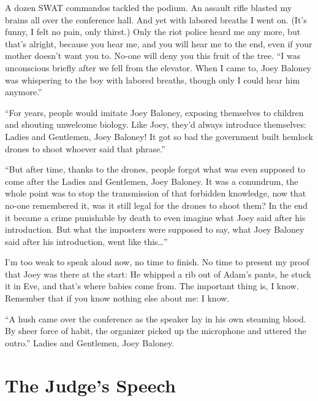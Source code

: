 \documentclass[oneside]{book}
\begin{document}
A dozen SWAT commandos tackled the podium.
An assault rifle blasted my brains all over the conference hall.
And yet with labored breaths I went on.
(It's funny, I felt no pain, only thirst.)
Only the riot police heard me any more, but that's alright,
because you hear me, and you will hear me to the end, even if your mother
doesn't want you to.  No-one will deny you this fruit of the tree.
``I was unconscious briefly after we fell from the elevator.
When I came to, Joey Baloney was whispering to the boy with labored breaths,
though only I could hear him anymore.''

``For years, people would imitate Joey Baloney, exposing themselves to children
and shouting unwelcome biology.  Like Joey, they'd always introduce themselves:
Ladies and Gentlemen, Joey Baloney!  It got so bad the government built
hemlock drones to shoot whoever said that phrase.''

``But after time, thanks to the drones, people forgot what was even supposed to come
after the Ladies and Gentlemen, Joey Baloney.  It was a conundrum, the
whole point was to stop the transmission of that forbidden knowledge,
now that no-one remembered it, was it still legal for the drones to shoot them?
In the end it became a crime punishable by death to even imagine what Joey
said after his introduction.
But what the imposters were supposed to say, what Joey Baloney said after his
introduction, went like this\ldots''

I'm too weak to speak aloud now, no time to finish.
No time to present my proof that Joey was there at the start:
He whipped a rib out of Adam's pants, he stuck it in Eve, and that's where
babies come from.  The important thing is, I know.
Remember that if you know nothing else about me: I know.

``A hush came over the conference as the speaker lay in his own steaming blood.
By sheer force of habit, the organizer picked up the microphone and uttered the
outro.''  Ladies and Gentlemen, Joey Baloney.


\chapter{The Judge's Speech}
\end{document}
